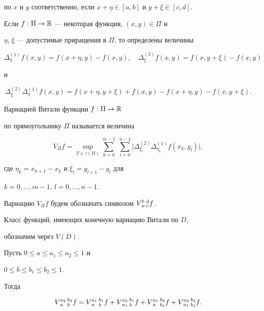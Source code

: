 по $x$ и $y$ соответственно, если $x+\eta\in [a,b]$ и $y+\xi\in [c,d]$.


Если $f: \Pi\to{\Bbb R}$ --- некоторая функция, $(x,y)\in\Pi$ и


$\eta$, $\xi$ --- допустимые приращения в $\Pi$, то определены величины


$$


\Delta_{\eta}^{(1)} f(x, y) = f(x+\eta, y) - f(x, y),\quad


\Delta_{\xi}^{(2)}  f(x, y) = f(x, y+\xi) - f(x, y)


$$


и


$$


\Delta_{\xi}^{(2)} \Delta_{\eta}^{(1)} f(x, y) = f(x+\eta, y+\xi)+f(x, y) -


f(x+\eta, y) - f(x, y+\xi).


$$





\begin{defn}


Вариацией Витали функции $f: \Pi\to{\Bbb R}$


по прямоугольнику $\Pi$ называется величина


$$


{V_\Pi} f=\sup\limits_{T\in \tau(\Pi)} \sum\limits_{k=0}^{m-1}\;


\sum\limits_{l=0}^{n-1}


\bigl| \Delta_{\xi_l}^{(2)} \Delta_{\eta_k}^{(1)} f(x_k, y_l) \bigr|,


$$


где $\eta_k=x_{k+1}-x_k$ и $\xi_l=y_{l+1}-y_l$ для


$k=0,\dotsc,m-1$, $l=0,\dotsc,n-1$.


Вариацию ${V_\Pi} f$ будем обозначать символом $V{}_{a}^{b}\,{}_{c}^{d} f$.


Класс функций, имеющих конечную вариацию Витали по $D$,


обозначим через $V(D)$.


\end{defn}





\begin{lem}


Пусть $0\leqslant a\leqslant a_1\leqslant a_2\leqslant 1$ и


$0\leqslant b\leqslant b_1\leqslant b_2\leqslant 1$.


Тогда


$$


\V a{a_2}b{b_2} f= \V a{a_1}b{b_1} f + \V {a_1}{a_2}b{b_1} f +


\V a{a_1}{b_1}{b_2} f + \V {a_1}{a_2}{b_1}{b_2} f.


$$


\end{lem}





